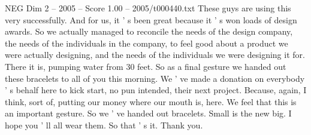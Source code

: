 \begin{textsample}{NEG Dim 2 – 2005 – Score 1.00 – 2005/t000440.txt}
These guys are using this very successfully.
And for us, it ' s been great because it ' s won loads of design awards.
So we actually managed to reconcile the needs of the design company, the needs of the individuals in the company, to feel good about a product we were actually designing, and the needs of the individuals we were designing it for.
There it is, pumping water from 30 feet.
So as a final gesture we handed out these bracelets to all of you this morning.
We ' ve made a donation on everybody ' s behalf here to kick start, no pun intended, their next project.
Because, again, I think, sort of, putting our money where our mouth is, here.
We feel that this is an important gesture.
So we ' ve handed out bracelets.
Small is the new big.
I hope you ' ll all wear them.
So that ' s it.
Thank you.

\end{textsample}
